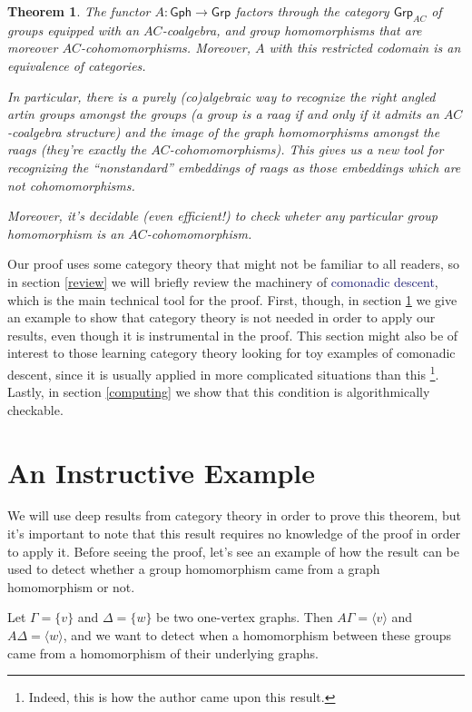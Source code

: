 \documentclass[12pt]{article}
\newtheorem{thm}{Theorem}
\theoremstyle{definition}
\theoremstyle{theorem}
\newcommand*{\important}[1]{\textcolor{MidnightBlue}{#1}}
\begin{document}
  \begin{thm}
    The functor $A : \mathsf{Gph} \to \mathsf{Grp}$ factors through 
    the category $\mathsf{Grp}_{AC}$ of groups equipped with an $AC$-coalgebra,
    and group homomorphisms that are moreover $AC$-cohomomorphisms. Moreover,
    $A$ with this restricted codomain is an equivalence of categories.

    In particular, there is a purely (co)algebraic way to recognize the 
    right angled artin groups amongst the groups 
    (a group is a raag if and only if it admits an $AC$-coalgebra structure)
    and the image of the graph homomorphisms amongst the raags 
    (they're exactly the $AC$-cohomomorphisms).
    This gives us a new tool for recognizing the ``nonstandard'' embeddings 
    of raags as those embeddings which are \emph{not} cohomomorphisms.

    Moreover, it's decidable (even efficient!) to check wheter any particular
    group homomorphism is an $AC$-cohomomorphism.
  \end{thm}

  Our proof uses some category theory that might not be familiar to all
  readers, so in section \ref{review} we will briefly review the machinery 
  of \important{comonadic descent}, which is the main technical tool for 
  the proof. First, though, in section \ref{eg} we give an example to show that 
  category theory is not needed in order to apply our results, even though 
  it is instrumental in the proof. This section might also be of interest to 
  those learning category theory looking for toy examples of comonadic descent, 
  since it is usually applied in more complicated situations than this%
  \footnote{Indeed, this is how the author came upon this result.}. 
  Lastly, in section \ref{computing} we show that this condition is 
  algorithmically checkable.

\section{An Instructive Example}
\label{eg}

We will use deep results from category theory in order to prove this theorem,
but it's important to note that this result requires no knowledge of the 
proof in order to apply it. Before seeing the proof,
let's see an example of how the result can be used to detect whether a group 
homomorphism came from a graph homomorphism or not.

Let $\Gamma = \{ v \}$ and $\Delta = \{ w \}$ be two one-vertex graphs.
Then $A \Gamma = \langle v \rangle$ and $A \Delta = \langle w \rangle$,
and we want to detect when a homomorphism between these groups came from a
homomorphism of their underlying graphs.
\end{document}
